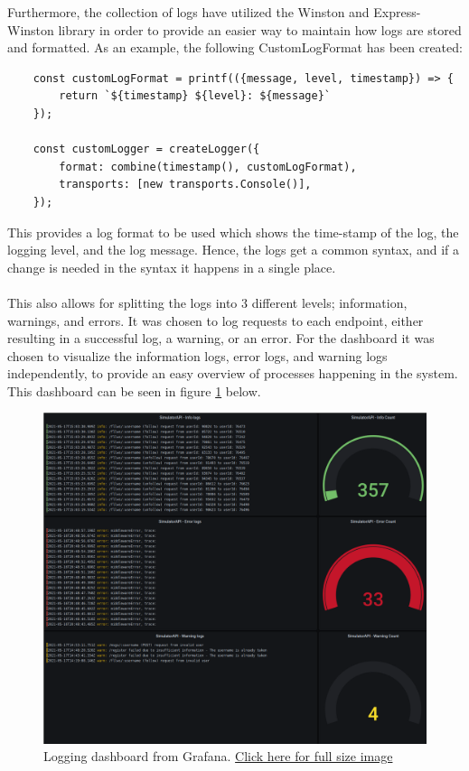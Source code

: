 Furthermore, the collection of logs have utilized the Winston and Express-Winston library in order to provide an easier way to maintain how logs are stored and formatted.\cite{winston} As an example, the following CustomLogFormat has been created:
\begin{verbatim}
    const customLogFormat = printf(({message, level, timestamp}) => {
        return `${timestamp} ${level}: ${message}`
    });
    
    const customLogger = createLogger({
        format: combine(timestamp(), customLogFormat),
        transports: [new transports.Console()],
    });
\end{verbatim}
This provides a log format to be used which shows the time-stamp of the log, the logging level, and the log message. Hence, the logs get a common syntax, and if a change is needed in the syntax it happens in a single place.
\\\\
This also allows for splitting the logs into 3 different levels; information, warnings, and errors. It was chosen to log requests to each endpoint, either resulting in a successful log, a warning, or an error.
\noindent
For the dashboard it was chosen to visualize the information logs, error logs, and warning logs independently, to provide an easy overview of processes happening in the system. This dashboard can be seen in figure \ref{fig:loggingDashboard} below.\\

\begin{figure}[H]
    \centering
    \includegraphics[width=\textwidth]{report/images/2021-05-17-170456_1401x1210_scrot.png}
    \caption{Logging dashboard from Grafana. \href{https://github.com/Niels-Frederik/MiniTwit/blob/main/report/images/2021-05-17-170456_1401x1210_scrot.png}{Click here for full size image}}
    \label{fig:loggingDashboard}
\end{figure}


